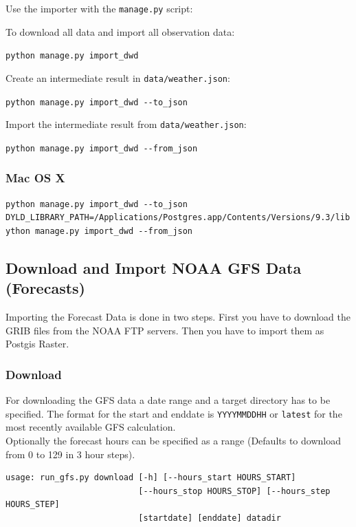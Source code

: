 \documentclass[paper=a4, fontsize=11pt]{scrartcl} %
\numberwithin{equation}{section} %
\numberwithin{figure}{section} %
\numberwithin{table}{section} %
\begin{document}
Use the importer with the \texttt{manage.py} script:

To download all data and import all observation data:

\texttt{python\ manage.py\ import\_dwd}

Create an intermediate result in \texttt{data/weather.json}:

\texttt{python\ manage.py\ import\_dwd\ -\/-to\_json}

Import the intermediate result from \texttt{data/weather.json}:

\texttt{python\ manage.py\ import\_dwd\ -\/-from\_json}

\subsubsection*{Mac OS X}\label{mac-os-x-1}

\begin{lstlisting}[breaklines=true]
python manage.py import_dwd --to_json
DYLD_LIBRARY_PATH=/Applications/Postgres.app/Contents/Versions/9.3/lib ython manage.py import_dwd --from_json
\end{lstlisting}

\subsection{Download and Import NOAA GFS Data
(Forecasts)}\label{download-and-import-noaa-gfs-data-forecasts}

Importing the Forecast Data is done in two steps. First you have to
download the GRIB files from the NOAA FTP servers. Then you have to
import them as Postgis Raster.

\subsubsection*{Download}\label{download}

For downloading the GFS data a date range and a target directory has to
be specified. The format for the start and enddate is
\texttt{YYYYMMDDHH} or \texttt{latest} for the most recently available
GFS calculation.\\Optionally the forecast hours can be specified as a
range (Defaults to download from 0 to 129 in 3 hour steps).

\begin{verbatim}
usage: run_gfs.py download [-h] [--hours_start HOURS_START]
                           [--hours_stop HOURS_STOP] [--hours_step HOURS_STEP]
                           [startdate] [enddate] datadir
\end{verbatim}
\end{document}

